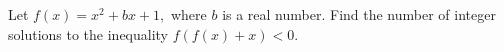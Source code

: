 Let $f(x)=x^2+bx+1,$ where $b$ is a  real number. Find the number of integer solutions to the inequality $f(f(x)+x)<0.$